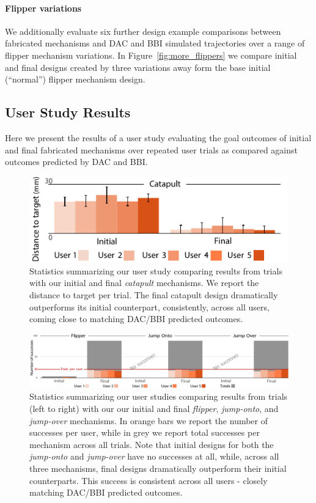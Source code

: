 \paragraph{Flipper variations}
We additionally evaluate six further design example comparisons between fabricated mechanisms and DAC and BBI simulated trajectories over a range of flipper mechanism variations. In Figure~\ref{fig:more_flippers} we compare initial and final designs created by three variations away form the base initial (``normal'') flipper mechanism design.

\subsection{User Study Results}
\label{sec:user}
Here we present the results of a user study evaluating the goal outcomes of initial and final fabricated mechanisms over repeated user trials as compared against outcomes predicted by DAC and BBI.

\begin{figure}[h!]
\includegraphics[width=\columnwidth]{./figs/UserStudyCatapult.pdf}
\caption{Statistics summarizing our user study comparing results from trials with our initial and final \emph{catapult} mechanisms. We report the distance to target per trial. The final catapult design dramatically outperforms its initial counterpart, consistently, across all users, coming close to matching DAC/BBI predicted outcomes.}
\label{fig:userStudyCatapult}
\end{figure}

\begin{figure}[hpt!]
\includegraphics[width=\textwidth]{./figs/UserStudyJumpers.pdf}
\caption{
Statistics summarizing our user studies comparing results from trials (left to right) with our our initial and final  \emph{flipper}, \emph{jump-onto}, and \emph{jump-over} mechanisms. In orange bars we report the number of successes per user, while in grey we report total successes per mechanism across all trials. Note that  initial designs for both the \emph{jump-onto} and \emph{jump-over} have no successes at all, while, across all three mechanisms, final designs dramatically outperform their initial counterparts. This success is consistent across all users - closely matching DAC/BBI predicted outcomes.}
\label{fig:userStudyJumpers}
\end{figure}

